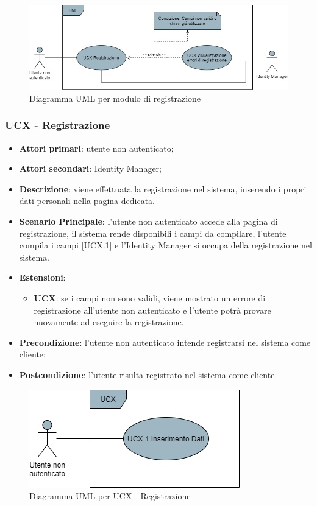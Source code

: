 \begin{figure}[H]
\centering
\includegraphics[scale=0.6]{res/UseCase/Immagini/RegistrazioneGenerale}
\caption{Diagramma UML per modulo di registrazione}
\end{figure}

\subsubsection{UCX - Registrazione}
\begin{itemize}
\item \textbf{Attori primari}: utente non autenticato;
\item \textbf{Attori secondari}: Identity Manager;
\item \textbf{Descrizione}: viene effettuata la registrazione nel sistema, inserendo i propri dati personali nella pagina dedicata.
\item \textbf{Scenario Principale}: l'utente non autenticato accede alla pagina di registrazione, il sistema rende disponibili i campi da compilare, l'utente compila i campi [UCX.1] e l'Identity Manager si occupa della registrazione nel sistema.
\item \textbf{Estensioni}:
\begin{itemize}
\item \textbf{UCX}: se i campi non sono validi, viene mostrato un errore di registrazione all'utente non autenticato e l'utente potrà provare nuovamente ad eseguire la registrazione.
\end{itemize}
\item \textbf{Precondizione}: l'utente non autenticato intende registrarsi nel sistema come cliente;
\item \textbf{Postcondizione}: l'utente risulta registrato nel sistema come cliente.
\end{itemize}

\begin{figure}[H]
\centering
\includegraphics[scale=0.6]{res/UseCase/Immagini/Registrazione}
\caption{Diagramma UML per UCX - Registrazione}
\end{figure}

